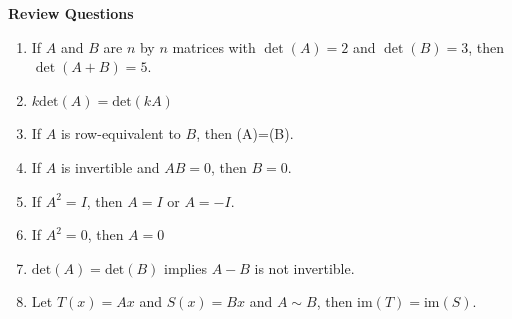 \documentclass[12pt,letterpaper]{article}
\begin{document}
\thispagestyle{fancy}

\begin{center}
{\bf Review Questions}
\end{center}

\begin{enumerate}


\begin{enumerate}
\item  If $A$ and $B$ are $n$ by $n$ matrices with $\det(A)=2$ and $\det(B)=3$, then $\det(A+B)=5$.
\item $k \text{det}(A) = \text{det}(kA)$
\item If $A$ is row-equivalent to $B$, then (A)=(B).
\item If $A$ is invertible and $AB=0$, then $B=0$.
\item If $A^2=I$, then $A=I$ or $A=-I$.
\item If $A^2=0$, then $A=0$
\item $\text{det}(A) = \text{det}(B)$ implies $A-B$ is not invertible.
\item Let $T(x) =Ax$ and $S(x)=Bx$ and $A \sim B$, then $\text{im}(T) = \text{im}(S)$.

\end{enumerate}
\end{enumerate}
\end{document}
